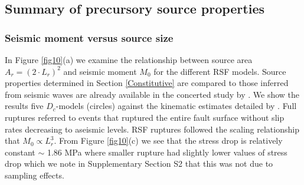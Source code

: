 \documentclass[preprint,1p, 10pt,authoryear]{elsarticle}
\begin{document}
\subsection{Summary of precursory source properties}
\subsubsection{Seismic moment versus source size}
In Figure \ref{fig10}(a) we examine the relationship between source area $A_{r} = (2\cdot L_{r})^{2}$ and seismic moment $M_{0}$ for the different RSF models. Source properties determined in Section \ref{Constitutive} are compared to those inferred from seismic waves are already available in the concerted study by \citet{Selvadurai2019}. We show the results five $D_{c}$-models (circles) against the kinematic estimates detailed by \citet{Selvadurai2019}.  Full ruptures referred to events that ruptured the entire fault surface without slip rates decreasing to aseismic levels. RSF ruptures followed the scaling relationship that $M_{0} \propto L_{r}^{3}$. From Figure \ref{fig10}(c) we see that the stress drop is relatively constant $\sim$ 1.86 MPa where smaller rupture had slightly lower values of stress drop which we note in Supplementary Section S2 that this was not due to sampling effects.
\end{document}
